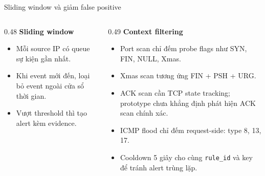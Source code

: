 \documentclass[t, aspectratio=169]{beamer}
\begin{document}
\begin{frame}{Sliding window và giảm false positive}
    \small
    \begin{columns}[T,onlytextwidth]
        \begin{column}{0.48\textwidth}
            \textbf{Sliding window}
            \begin{itemize}
                \item Mỗi source IP có queue sự kiện gần nhất.
                \item Khi event mới đến, loại bỏ event ngoài cửa sổ thời gian.
                \item Vượt threshold thì tạo alert kèm evidence.
            \end{itemize}
        \end{column}
        \begin{column}{0.49\textwidth}
            \textbf{Context filtering}
            \begin{itemize}
                \item Port scan chỉ đếm probe flags như SYN, FIN, NULL, Xmas.
                \item Xmas scan tương ứng FIN + PSH + URG.
                \item ACK scan cần TCP state tracking; prototype chưa khẳng định phát hiện ACK scan chính xác.
                \item ICMP flood chỉ đếm request-side: type 8, 13, 17.
                \item Cooldown 5 giây cho cùng \texttt{rule\_id} và key để tránh alert trùng lặp.
            \end{itemize}
        \end{column}
    \end{columns}

\end{frame}
\end{document}

